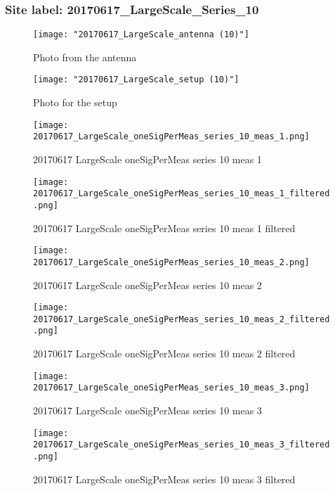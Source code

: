\subsubsection{Site label: 20170617\_LargeScale\_Series\_10}
\begin{figure}[ht] \caption{Photo from the antenna}
\texttt{[image: "20170617\_LargeScale\_antenna (10)"]}\centering\end{figure}
\begin{figure}[ht] \caption{Photo for the setup}
\texttt{[image: "20170617\_LargeScale\_setup (10)"]}\centering\end{figure}
\begin{figure}[ht] \caption{20170617 LargeScale oneSigPerMeas series 10 meas 1}
\texttt{[image: 20170617\_LargeScale\_oneSigPerMeas\_series\_10\_meas\_1.png]}\centering\end{figure}
\begin{figure}[ht] \caption{20170617 LargeScale oneSigPerMeas series 10 meas 1 filtered}
\texttt{[image: 20170617\_LargeScale\_oneSigPerMeas\_series\_10\_meas\_1\_filtered.png]}\centering\end{figure}
\begin{figure}[ht] \caption{20170617 LargeScale oneSigPerMeas series 10 meas 2}
\texttt{[image: 20170617\_LargeScale\_oneSigPerMeas\_series\_10\_meas\_2.png]}\centering\end{figure}
\begin{figure}[ht] \caption{20170617 LargeScale oneSigPerMeas series 10 meas 2 filtered}
\texttt{[image: 20170617\_LargeScale\_oneSigPerMeas\_series\_10\_meas\_2\_filtered.png]}\centering\end{figure}
\begin{figure}[ht] \caption{20170617 LargeScale oneSigPerMeas series 10 meas 3}
\texttt{[image: 20170617\_LargeScale\_oneSigPerMeas\_series\_10\_meas\_3.png]}\centering\end{figure}
\begin{figure}[ht] \caption{20170617 LargeScale oneSigPerMeas series 10 meas 3 filtered}
\texttt{[image: 20170617\_LargeScale\_oneSigPerMeas\_series\_10\_meas\_3\_filtered.png]}\centering\end{figure}
\clearpage
